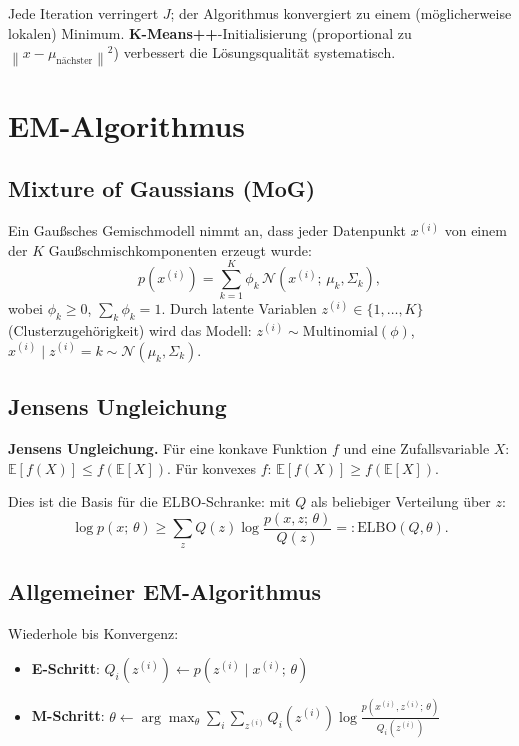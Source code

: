 \documentclass[11pt]{article}
\theoremstyle{csthm}
\theoremstyle{csdef}
\newcommand{\E}{\mathbb{E}}
\newcommand{\N}{\mathcal{N}}
\newcommand{\norm}[1]{\left\|#1\right\|}
\begin{document}
Jede Iteration verringert $J$; der Algorithmus konvergiert zu einem
(möglicherweise lokalen) Minimum. \textbf{K-Means++}-Initialisierung
(proportional zu $\norm{x - \mu_\text{nächster}}^2$) verbessert die
Lösungsqualität systematisch.

\section{EM-Algorithmus}

\subsection{Mixture of Gaussians (MoG)}

Ein Gaußsches Gemischmodell nimmt an, dass jeder Datenpunkt $x^{(i)}$ von
einem der $K$ Gaußschmischkomponenten erzeugt wurde:
\begin{equation}
  p(x^{(i)}) = \sum_{k=1}^K \phi_k\,\N(x^{(i)};\,\mu_k, \Sigma_k),
\end{equation}
wobei $\phi_k \geq 0$, $\sum_k \phi_k = 1$. Durch latente Variablen $z^{(i)}
\in \{1,\ldots,K\}$ (Clusterzugehörigkeit) wird das Modell:
$z^{(i)} \sim \text{Multinomial}(\phi)$, $x^{(i)} \mid z^{(i)}=k \sim
\N(\mu_k, \Sigma_k)$.

\subsection{Jensens Ungleichung}

\begin{tcolorbox}[thmstyle]
\textbf{Jensens Ungleichung.}
Für eine konkave Funktion $f$ und eine Zufallsvariable $X$:
$\E[f(X)] \leq f(\E[X])$.
Für konvexes $f$: $\E[f(X)] \geq f(\E[X])$.
\end{tcolorbox}

Dies ist die Basis für die ELBO-Schranke: mit $Q$ als beliebiger Verteilung
über $z$:
\begin{equation}
  \log p(x;\,\theta)
  \geq \sum_z Q(z)\log\frac{p(x,z;\,\theta)}{Q(z)}
  =: \mathrm{ELBO}(Q, \theta).
\end{equation}

\subsection{Allgemeiner EM-Algorithmus}

\begin{tcolorbox}[algostyle, title={Expectation-Maximization (EM)}]
Wiederhole bis Konvergenz:
\begin{itemize}[leftmargin=*, itemsep=2pt]
  \item \textbf{E-Schritt}: $Q_i(z^{(i)}) \leftarrow p(z^{(i)} \mid x^{(i)};\,\theta)$
  \item \textbf{M-Schritt}:
    $\theta \leftarrow \arg\max_\theta \sum_i \sum_{z^{(i)}} Q_i(z^{(i)}) \log\frac{p(x^{(i)}, z^{(i)};\,\theta)}{Q_i(z^{(i)})}$
\end{itemize}
\end{tcolorbox}
\end{document}
